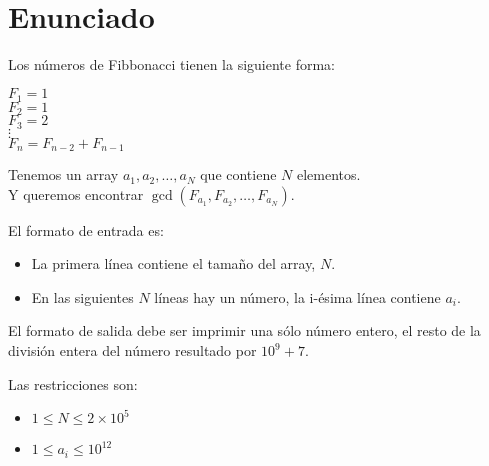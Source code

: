 \documentclass{article}
\title{                                             %
    \vspace{2in}
    \textmd{\textbf{\asignatura \\ \titulo}} \\         %
    \normalsize\vspace{0.1in}\small{\fecha}  \\         %
    \vspace{3in}
}
\author{\textbf{\autor}}                            %
\date{}                                             %
\theoremstyle{theorem-style}  %
\theoremstyle{definition}
\theoremstyle{example-style}
\begin{document}
\maketitle



\newpage

\section*{Enunciado}
    Los números de Fibbonacci tienen la siguiente forma:
    
    \begin{center}
        $F_1 = 1$\\
        $F_2 = 1$\\
        $F_3 = 2$\\
        $\vdots$\\
        $F_n = F_{n-2} + F_{n-1}$
    \end{center}
    
    Tenemos un array $a_1,a_2,\dots,a_N$ que contiene $N$ elementos.\\
    Y queremos encontrar $\gcd(F_{a_1},F_{a_2},\dots,F_{a_N})$.
    
    El formato de entrada es:
    \begin{itemize}
        \item La primera línea contiene el tamaño del array, $N$.
        \item En las siguientes $N$ líneas hay un número, la i-ésima línea contiene $a_i$.
    \end{itemize} 
    
    El formato de salida debe ser imprimir una sólo número entero, el resto de la división entera del número resultado por $10^9+7$.
    
    Las restricciones son:
    \begin{itemize}
        \item $1 \leq N \leq 2 \times 10^5$
        \item $1 \leq a_i \leq 10^{12}$
    \end{itemize} 
\end{document}
